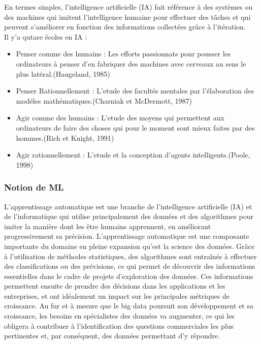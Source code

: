 \documentclass[12pt]{report}
\begin{document}
En termes simples, l'intelligence artificielle (IA) fait référence à des systèmes ou des machines qui imitent l'intelligence humaine pour effectuer des tâches et qui peuvent s'améliorer en fonction des informations collectées grâce à l'itération\cite{38}.\\

Il y'a qutare écoles en IA : 
\begin{itemize}
\item Penser comme des humains : Les efforts passionnats pour pousser les ordinateurs à penser d'en fabriquer des machines avec cerveaux au sens le plus latéral.(Haugeland, 1985)
\item Penser Rationnellement : L'etude des facultés mentales par l'élaboration des modéles mathématiques.(Charniak et McDermott, 1987)
\item Agir comme des humains : L'etude des moyens qui permettent aux ordinateurs de faire des choses qui pour le moment sont mieux faites par des hommes.(Rich et Knight, 1991)
\item Agir rationnellement : L'etude et la conception d'agents intelligents.(Poole, 1998)
\end{itemize}

\subsubsection{Notion de ML}

L'apprentissage automatique est une branche de l'intelligence artificielle
(IA) et de l'informatique qui utilise principalement des données et des
algorithmes pour imiter la manière dont les être humains apprennent, en
améliorant progressivement sa précision.
L'apprentissage automatique est une composante importante du domaine
en pleine expansion qu'est la science des données. Grâce à l'utilisation de
méthodes statistiques, des algorithmes sont entraînés à effectuer des
classifications ou des prévisions, ce qui permet de découvrir des
informations essentielles dans le cadre de projets d'exploration des
données. Ces informations permettent ensuite de prendre des décisions
dans les applications et les entreprises, et ont idéalement un impact sur les
principales métriques de croissance. Au fur et à mesure que le big data
poursuit son développement et sa croissance, les besoins en spécialistes
des données va augmenter, ce qui les obligera à contribuer à l'identification
des questions commerciales les plus pertinentes et, par conséquent, des
données permettant d'y répondre\cite{39}.\\
\end{document}
